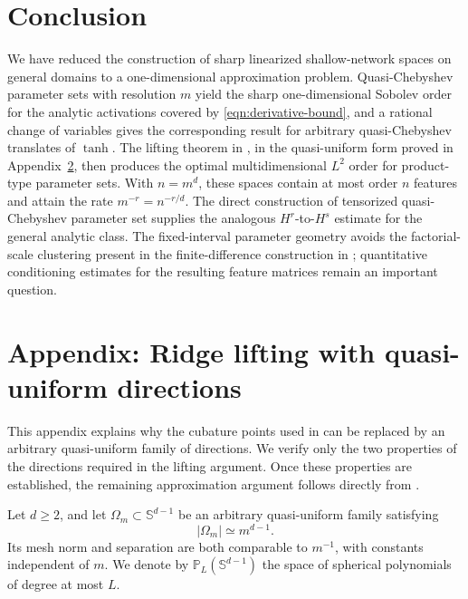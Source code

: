 \documentclass{article}
\numberwithin{equation}{section}
\def\SS{\mathbb{S}}
\begin{document}
\section{Conclusion}\label{sec:conclusion}
We have reduced the construction of sharp linearized shallow-network spaces on general domains to a one-dimensional approximation problem. Quasi-Chebyshev parameter sets with resolution $m$ yield the sharp one-dimensional Sobolev order for the analytic activations covered by \eqref{eqn:derivative-bound}, and a rational change of variables gives the corresponding result for arbitrary quasi-Chebyshev translates of $\tanh$. The lifting theorem in \cite{petrushev1998approximation}, in the quasi-uniform form proved in Appendix~\ref{app:quasiuniform-lifting}, then produces the optimal multidimensional $L^2$ order for product-type parameter sets. With $n=m^d$, these spaces contain at most order $n$ features and attain the rate $m^{-r}=n^{-r/d}$. The direct construction of tensorized quasi-Chebyshev parameter set supplies the analogous $H^r$-to-$H^s$ estimate for the general analytic class. The fixed-interval parameter geometry avoids the factorial-scale clustering present in the finite-difference construction in \cite{mhaskar1996neural}; quantitative conditioning estimates for the resulting feature matrices remain an important question.




\section{Appendix: Ridge lifting with quasi-uniform directions}\label{app:quasiuniform-lifting}

This appendix explains why the cubature points used in \cite{petrushev1998approximation} can be replaced by an arbitrary quasi-uniform family of directions. We verify only the two properties of the directions required in the lifting argument. Once these properties are established, the remaining approximation argument follows directly from \cite[Sections~3, 7, and~8]{petrushev1998approximation}.

Let $d\geq2$, and let $\Omega_m\subset\SS^{d-1}$ be an arbitrary quasi-uniform family satisfying
$$
|\Omega_m|\simeq m^{d-1}.
$$
Its mesh norm and separation are both comparable to $m^{-1}$, with constants independent of $m$. We denote by $\mathbb P_L(\SS^{d-1})$ the space of spherical polynomials of degree at most $L$.
\end{document}
